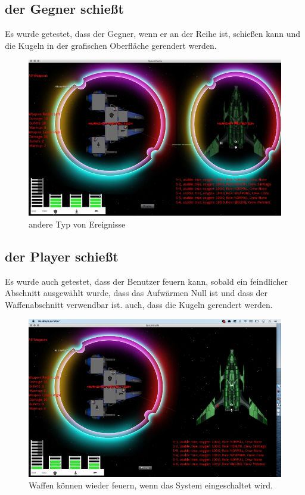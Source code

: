 \documentclass[12pt]{article}
\begin{document}
\newpage
\subsection{der Gegner schießt}
Es wurde getestet, dass der Gegner, wenn er an der Reihe ist, schießen kann und die Kugeln in der grafischen Oberfläche gerendert werden.
\begin{figure}[htp]
\centering
\includegraphics[scale=0.7]{TestProtocolBilder/OptimizedgegnerShots.png}
\caption{andere Typ von Ereignisse}
\end{figure}


\newpage
\subsection{der Player schießt}
Es wurde auch getestet, dass der Benutzer feuern kann, sobald ein feindlicher Abschnitt ausgewählt wurde, dass das Aufwärmen Null ist und dass der Waffenabschnitt verwendbar ist. auch, dass die Kugeln gerendert werden.
\begin{figure}[htp]
\centering
\includegraphics[scale=0.7]{TestProtocolBilder/OptimizedweaponsShot.png}
\caption{Waffen können wieder feuern, wenn das System eingeschaltet wird.}
\end{figure}
\end{document}
